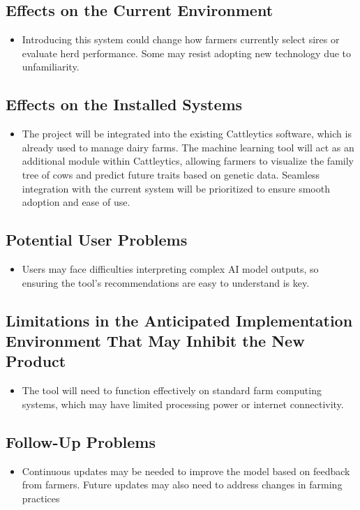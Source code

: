 \documentclass[12pt]{article}
\begin{document}
\subsection{Effects on the Current Environment}
\begin{itemize}
  \item Introducing this system could change how farmers currently select sires
  or evaluate herd performance. Some may resist adopting new technology due to
  unfamiliarity.
\end{itemize}
\subsection{Effects on the Installed Systems}
\begin{itemize}
  \item The project will be integrated into the existing Cattleytics
  software, which is already used to manage dairy farms. The machine learning
  tool will act as an additional module within Cattleytics, allowing farmers to
  visualize the family tree of cows and predict future traits based on genetic
  data. Seamless integration with the current system will be prioritized to
  ensure smooth adoption and ease of use.
\end{itemize}
\subsection{Potential User Problems}
\begin{itemize}
  \item Users may face difficulties interpreting complex AI model outputs, so
  ensuring the tool’s recommendations are easy to understand is key.
\end{itemize}
\subsection{Limitations in the Anticipated Implementation Environment That May
Inhibit the New Product}
\begin{itemize}
  \item The tool will need to function effectively on standard farm computing
  systems, which may have limited processing power or internet connectivity.
\end{itemize}
\subsection{Follow-Up Problems}
\begin{itemize}
  \item Continuous updates may be needed to improve the model based on feedback
  from farmers. Future updates may also need to address changes in farming
  practices
\end{itemize}
\end{document}
